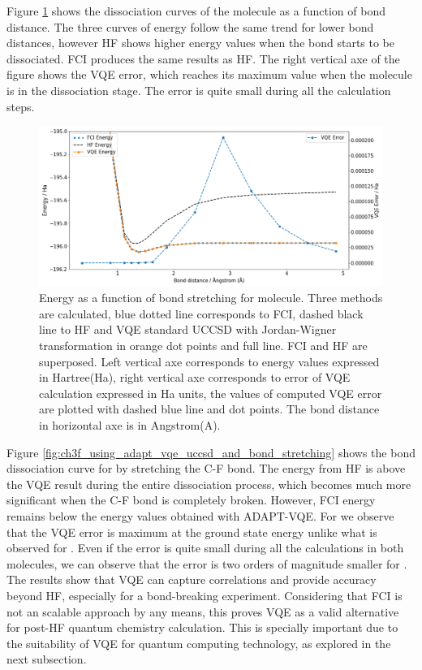 \documentclass[journal,onecolumn]{IEEEtran}
\begin{document}
Figure \ref{fig:f2_using_uccsd_and_bond_stretching} shows the dissociation curves of the  molecule as a function of bond distance. 
The three curves of energy follow the same trend for lower bond distances, however HF shows higher energy values when the bond starts to be dissociated. 
FCI produces the same results as HF. 
The right vertical axe of the figure shows the VQE error, which reaches its maximum value when the molecule is in the dissociation stage.  
The error is quite small during all the calculation steps.

\begin{figure}[!htb]
\centering
\includegraphics[width=\textwidth]{bond_stretching_F2.png}
\caption{Energy as a function of bond stretching for  molecule. Three methods are calculated, blue dotted line corresponds to FCI, dashed black line to HF and VQE standard UCCSD with Jordan-Wigner transformation in orange dot points and full line. FCI and HF are superposed. Left vertical axe corresponds to energy values expressed in Hartree(Ha), right vertical axe corresponds to error of VQE calculation expressed in Ha units, the values of computed VQE error are plotted with dashed blue line and dot points. The bond distance in horizontal axe is in Angstrom(A).}
\label{fig:f2_using_uccsd_and_bond_stretching}
\end{figure}

Figure \ref{fig:ch3f_using_adapt_vqe_uccsd_and_bond_stretching} shows the bond dissociation curve for  by stretching the C-F bond. The energy from HF is above the VQE result during the entire dissociation process, which becomes much more significant when the C-F bond is completely broken. 
However, FCI energy remains below the energy values obtained with ADAPT-VQE. 
For  we observe that the VQE error is maximum at the ground state energy unlike what is observed for . 
Even if the error is quite small during all the calculations in both molecules, we can observe that the error is two orders of magnitude smaller for .
%
The results show that VQE can capture correlations and provide accuracy beyond HF, especially for a bond-breaking experiment. 
Considering that FCI is not an scalable approach by any means, this proves VQE as a valid alternative for post-HF quantum chemistry calculation.
This is specially important due to the suitability of VQE for quantum computing technology, as explored in the next subsection.
\end{document}
